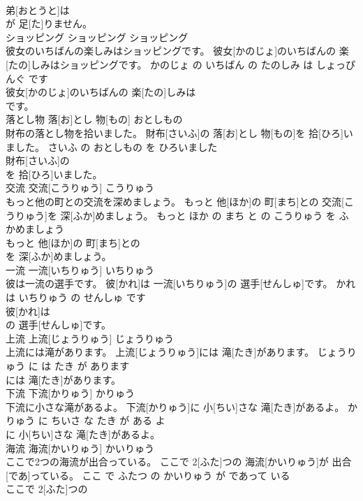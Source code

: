 \documentclass[8pt]{extreport}
\begin{document}
\begin{CJK}{UTF8}{min}
\\	弟[おとうと]は
\\	が 足[た]りません。			
\\	ショッピング	ショッピング	ショッピング	
\\	彼女のいちばんの楽しみはショッピングです。	彼女[かのじょ]のいちばんの 楽[たの]しみはショッピングです。	かのじょ の いちばん の たのしみ は しょっぴんぐ です	
\\	彼女[かのじょ]のいちばんの 楽[たの]しみは
\\	です。			
\\	落とし物	落[お]とし 物[もの]	おとしもの	
\\	財布の落とし物を拾いました。	財布[さいふ]の 落[お]とし 物[もの]を 拾[ひろ]いました。	さいふ の おとしもの を ひろいました	
\\	財布[さいふ]の
\\	を 拾[ひろ]いました。			
\\	交流	交流[こうりゅう]	こうりゅう	
\\	もっと他の町との交流を深めましょう。	もっと 他[ほか]の 町[まち]との 交流[こうりゅう]を 深[ふか]めましょう。	もっと ほか の まち と の こうりゅう を ふかめましょう	
\\	もっと 他[ほか]の 町[まち]との
\\	を 深[ふか]めましょう。			
\\	一流	一流[いちりゅう]	いちりゅう	
\\	彼は一流の選手です。	彼[かれ]は 一流[いちりゅう]の 選手[せんしゅ]です。	かれ は いちりゅう の せんしゅ です	
\\	彼[かれ]は
\\	の 選手[せんしゅ]です。			
\\	上流	上流[じょうりゅう]	じょうりゅう	
\\	上流には滝があります。	上流[じょうりゅう]には 滝[たき]があります。	じょうりゅう に は たき が あります	
\\	には 滝[たき]があります。			
\\	下流	下流[かりゅう]	かりゅう	
\\	下流に小さな滝があるよ。	下流[かりゅう]に 小[ちい]さな 滝[たき]があるよ。	かりゅう に ちいさ な たき が ある よ	
\\	に 小[ちい]さな 滝[たき]があるよ。			
\\	海流	海流[かいりゅう]	かいりゅう	
\\	ここで2つの海流が出合っている。	ここで 2[ふた]つの 海流[かいりゅう]が 出合[であ]っている。	ここ で ふたつ の かいりゅう が であって いる	
\\	ここで 2[ふた]つの

\end{CJK}
\end{document}
